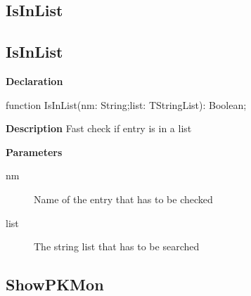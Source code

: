 \documentclass{report}
\newif\ifpdf
\begin{document}
\subsection*{\large{\textbf{IsInList}}\normalsize\hspace{1ex}\hrulefill}
\else
\subsection*{IsInList}
\fi
\label{common-IsInList}
\begin{list}{}{
\setlength{\itemindent}{0cm}
\setlength{\listparindent}{0cm}
\setlength{\leftmargin}{\evensidemargin}
\addtolength{\leftmargin}{\tmplength}
\settowidth{\labelsep}{X}
\addtolength{\leftmargin}{\labelsep}
\setlength{\labelwidth}{\tmplength}
}
\item[\textbf{Declaration}\hfill]
\ifpdf
\begin{flushleft}
\fi
\begin{ttfamily}
function IsInList(nm: String;list: TStringList): Boolean;\end{ttfamily}

\ifpdf
\end{flushleft}
\fi

\par
\item[\textbf{Description}]
Fast check if entry is in a list  \par
\item[\textbf{Parameters}]
\begin{description}
\item[nm] Name of the entry that has to be checked
\item[list] The string list that has to be searched
\end{description}


\end{list}
\ifpdf
\subsection*{\large{\textbf{ShowPKMon}}\normalsize\hspace{1ex}\hrulefill}
\else
\end{document}
